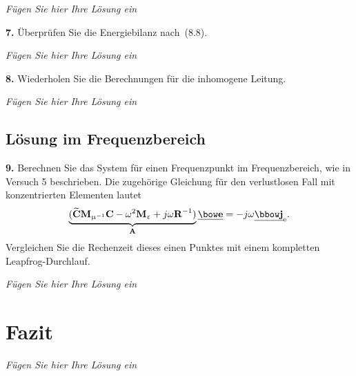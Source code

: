\documentclass[Protokollheft.tex]{subfiles}
\begin{document}
\emph{Fügen Sie hier Ihre Lösung ein}

\begin{framed}
	\noindent \textbf{7.} Überprüfen Sie die Energiebilanz nach~(8.8).\label{exer:checkEnergyBal4TLine}
\end{framed}

\emph{Fügen Sie hier Ihre Lösung ein}

\begin{framed}
	\noindent \textbf{8.} Wiederholen Sie die Berechnungen für die inhomogene Leitung.\label{exer:calc4inhomTLine}
\end{framed}

\emph{Fügen Sie hier Ihre Lösung ein}

{\subsection{Lösung im Frequenzbereich}}

\begin{framed}
	\noindent \textbf{9.} Berechnen Sie das System für einen Frequenzpunkt im
Frequenzbereich, wie in Versuch 5 beschrieben. Die zugehörige
Gleichung für den verlustlosen Fall mit konzentrierten
Elementen lautet
\begin{equation}
	\underbrace{(\curldfit \Mmui \curlfit -
	\omega^2 \Meps + j \omega {\textbf{R}}^{-1} )}_{\Amat} \ul \efit = - j \omega \ul \jfit_{\text{e}}.
\end{equation}
Vergleichen Sie die Rechenzeit dieses einen Punktes mit einem
kompletten Leapfrog-Durchlauf.\label{exer:cmpFreqSolWithLeapfrog}
\end{framed}

\emph{Fügen Sie hier Ihre Lösung ein}



\section{Fazit}
\emph{Fügen Sie hier Ihre Lösung ein}
\end{document}
